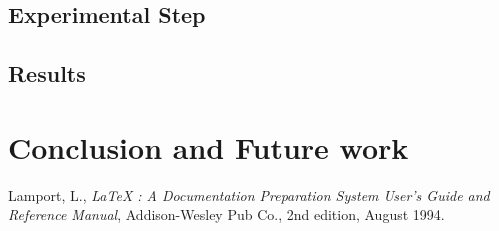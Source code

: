 \documentclass[11pt]{article}
\begin{document}
\subsection{Experimental Step}
\label{Experimental Step}

\subsection{Results}
\label{Results}


\section{Conclusion and Future work}
\label{Conclusion and Future work} 



\begin{thebibliography}{99}
 Lamport, L., {\it LaTeX : A Documentation
 Preparation System User's Guide and Reference Manual}, Addison-Wesley 
 Pub Co., 2nd edition, August 1994.
\end{thebibliography}
 
\end{document}
